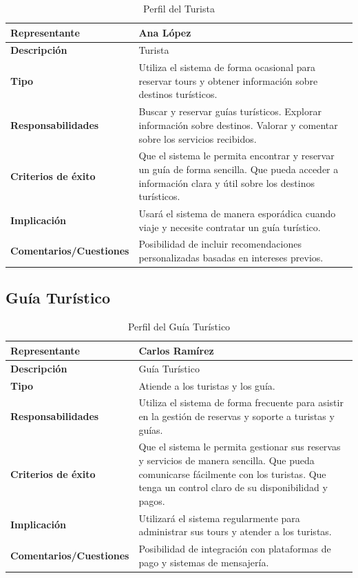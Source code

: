 \begin{table}[H]
\centering
\begin{tabular}{|p{5cm}|p{10cm}|}
\hline
\rowcolor[HTML]{CFE2F3} 
\textbf{Representante} & Ana López \\ \hline
\textbf{Descripción} & Turista \\ \hline
\textbf{Tipo} & Utiliza el sistema de forma ocasional para reservar tours y obtener información sobre destinos turísticos. \\ \hline
\textbf{Responsabilidades} & Buscar y reservar guías turísticos. Explorar información sobre destinos. Valorar y comentar sobre los servicios recibidos. \\ \hline
\textbf{Criterios de éxito} & Que el sistema le permita encontrar y reservar un guía de forma sencilla. Que pueda acceder a información clara y útil sobre los destinos turísticos. \\ \hline
\textbf{Implicación} & Usará el sistema de manera esporádica cuando viaje y necesite contratar un guía turístico. \\ \hline
\textbf{Comentarios/Cuestiones} & Posibilidad de incluir recomendaciones personalizadas basadas en intereses previos. \\ \hline
\end{tabular}
\caption{Perfil del Turista}
\label{tab:perfil_turista}
\end{table}


\subsection*{Guía Turístico}

\begin{table}[H]
\centering
\begin{tabular}{|p{5cm}|p{10cm}|}
\hline
\rowcolor[HTML]{CFE2F3} 
\textbf{Representante} & Carlos Ramírez \\ \hline
\textbf{Descripción} & Guía Turístico \\ \hline
\textbf{Tipo} & Atiende a los turistas y los guía. \\ \hline
\textbf{Responsabilidades} & Utiliza el sistema de forma frecuente para asistir en la gestión de reservas y soporte a turistas y guías.  \\ \hline
\textbf{Criterios de éxito} & Que el sistema le permita gestionar sus reservas y servicios de manera sencilla. Que pueda comunicarse fácilmente con los turistas. Que tenga un control claro de su disponibilidad y pagos. \\ \hline
\textbf{Implicación} & Utilizará el sistema regularmente para administrar sus tours y atender a los turistas. \\ \hline
\textbf{Comentarios/Cuestiones} & Posibilidad de integración con plataformas de pago y sistemas de mensajería. \\ \hline
\end{tabular}
\caption{Perfil del Guía Turístico}
\label{tab:perfil_guia}
\end{table}


